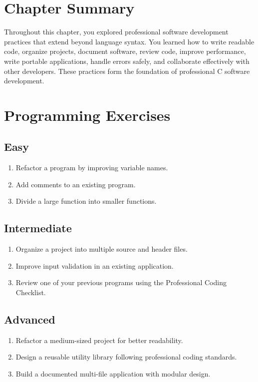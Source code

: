 \documentclass[12pt,openany]{book}
\begin{document}
\section{Chapter Summary}

Throughout this chapter, you explored professional software development practices that extend beyond language syntax. You learned how to write readable code, organize projects, document software, review code, improve performance, write portable applications, handle errors safely, and collaborate effectively with other developers. These practices form the foundation of professional C software development.

\section{Programming Exercises}

\subsection*{Easy}

\begin{enumerate}
    \item Refactor a program by improving variable names.
    \item Add comments to an existing program.
    \item Divide a large function into smaller functions.
\end{enumerate}

\subsection*{Intermediate}

\begin{enumerate}
    \item Organize a project into multiple source and header files.
    \item Improve input validation in an existing application.
    \item Review one of your previous programs using the Professional Coding Checklist.
\end{enumerate}

\subsection*{Advanced}

\begin{enumerate}
    \item Refactor a medium-sized project for better readability.
    \item Design a reusable utility library following professional coding standards.
    \item Build a documented multi-file application with modular design.
\end{enumerate}
\end{document}
